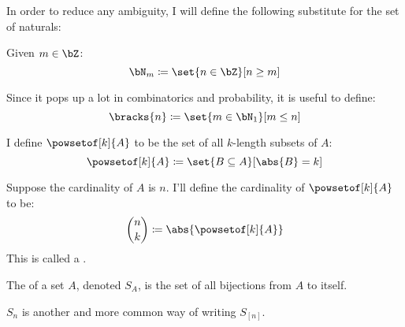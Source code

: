 \begin{defn*}

	In order to reduce any ambiguity, I will define the following substitute for the set of naturals:

	Given $m\in\bZ$:
	\[ \bN_m\coloneqq\set{n\in\bZ}[n\geq m] \]

\end{defn*}

\begin{defn*}

	Since it pops up a lot in combinatorics and probability, it is useful to define:
	\[ \bracks{n}\coloneqq\set{m\in\bN_1}[m\leq n]\]

\end{defn*}

\begin{defn*}

	I define $\powsetof[k]{A}$ to be the set of all $k$-length subsets of $A$:
	\[ \powsetof[k]{A}\coloneqq\set{B\subseteq A}[\abs{B}=k] \]

	Suppose the cardinality of $A$ is $n$. I'll define the cardinality of $\powsetof[k]{A}$ to be:
	\[ \binom{n}{k}\coloneqq\abs{\powsetof[k]{A}} \]
	This is called a .

\end{defn*}

\begin{defn*}

	The  of a set $A$, denoted $S_A$, is the set of all bijections from $A$ to itself.

	$S_n$ is another and more common way of writing $S_{[n]}$.

\end{defn*}

